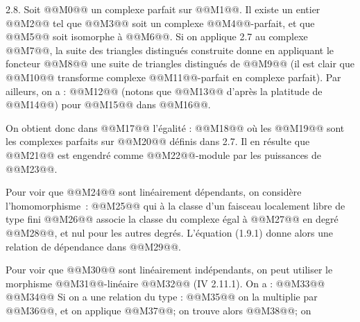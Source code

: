 
2.8.
Soit @@M0@@ un complexe parfait sur @@M1@@. Il existe un entier @@M2@@ tel que @@M3@@ soit un complexe @@M4@@-parfait, et que @@M5@@ soit isomorphe à @@M6@@. Si on applique 2.7 au complexe @@M7@@, la suite des triangles distingués construite donne en appliquant le foncteur @@M8@@ une suite de triangles distingués de @@M9@@ (il est clair que @@M10@@ transforme complexe @@M11@@-parfait en complexe parfait). Par ailleurs, on a :
@@M12@@
(notons que @@M13@@ d'après la platitude de @@M14@@) pour @@M15@@ dans @@M16@@.

On obtient donc dans @@M17@@ l'égalité :
@@M18@@
où les @@M19@@ sont les complexes parfaits sur @@M20@@ définis dans 2.7. Il en résulte que @@M21@@ est engendré comme @@M22@@-module par les puissances de @@M23@@.

Pour voir que @@M24@@ sont linéairement dépendants, on considère l'homomorphisme~: @@M25@@ qui à la classe d'un faisceau localement libre de type fini @@M26@@ associe la classe du complexe égal à @@M27@@ en degré @@M28@@, et nul pour les autres degrés. L'équation (1.9.1) donne alors une relation de dépendance dans @@M29@@.

Pour voir que @@M30@@ sont linéairement indépendants, on peut utiliser le morphisme @@M31@@-linéaire @@M32@@ (IV 2.11.1). On a :
@@M33@@
@@M34@@
Si on a une relation du type :
@@M35@@
on la multiplie par @@M36@@, et on applique @@M37@@; on trouve alors @@M38@@; on 
